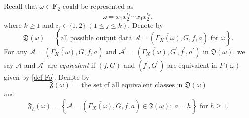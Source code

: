 \documentclass{amsart}
\theoremstyle{plain}
\theoremstyle{definition}
\theoremstyle{remark}
\begin{document}
 
Recall that $\omega\in\textbf{F}_2$ could be represented as
$$\omega=x_1x_2^{i_1}\cdots x_1x_2^{i_k},$$
where $k\geq 1$ and $i_j\in\{1,2\}\ (1\leq j\leq k)$.
Denote by
$$\mathfrak{D}(\omega)=\left\{\text{all possible output data $\mathcal{A}=\left(\overline{\Gamma_X(\omega)},G,f,a\right)$ for }\omega\right\}.$$
For any $\mathcal{A}=\left(\overline{\Gamma_X(\omega)},G,f,a\right)$ and $\mathcal{A}^\prime=\left(\overline{\Gamma_X(\omega)},G^\prime,f^\prime,a^\prime\right)$ in $\mathfrak{D}(\omega)$, we say $\mathcal{A}$ and $\mathcal{A}^\prime$ are \emph{equivalent} if $(f,G)$ and $(f^\prime,G^\prime)$ are equivalent in $F(\omega)$ given by \eqref{def-Fo}. Denote by
$$\mathfrak{F}(\omega)=\text{ the set of all equivalent classes in }\mathfrak{D}(\omega)$$
and
$$\mathfrak{F}_h(\omega)=\left\{\mathcal{A}=\left(\overline{\Gamma_X(\omega)},G,f,a\right)\in\mathfrak{F}(\omega);\ a=h\right\}\text{ for }h\geq 1.$$
\end{document}
